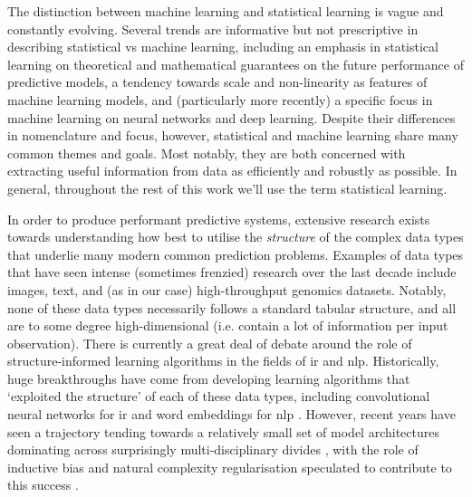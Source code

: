 \documentclass[thesis.tex]{subfiles}
\begin{document}
The distinction between machine learning and statistical learning is vague and constantly evolving. 
Several trends are informative but not prescriptive in describing statistical vs machine learning, including an emphasis in statistical learning on theoretical and mathematical guarantees on the future performance of predictive models, a tendency towards scale and non-linearity as features of machine learning models, and (particularly more recently) a specific focus in machine learning on neural networks and deep learning. Despite their differences in nomenclature and focus, however, statistical and machine learning share many common themes and goals. Most notably, they are both concerned with extracting useful information from data as efficiently and robustly as possible. In general, throughout the rest of this work we'll use the term statistical learning.

In order to produce performant predictive systems, extensive research exists towards understanding how best to utilise the \emph{structure} of the complex data types that underlie many modern common prediction problems. Examples of data types that have seen intense (sometimes frenzied) research over the last decade include images, text, and (as in our case) high-throughput genomics datasets. Notably, none of these data types necessarily follows a standard tabular structure, and all are to some degree high-dimensional (i.e. contain a lot of information per input observation). There is currently a great deal of debate around the role of structure-informed learning algorithms in the fields of \gls{ir} and \gls{nlp}. Historically, huge breakthroughs have come from developing learning algorithms that `exploited the structure' of each of these data types, including convolutional neural networks for \gls{ir} \citep{krizhevsky_imagenet_2012, he_deep_2016, huang_densely_2018} and word embeddings for \gls{nlp} \citep{mikolov_efficient_2013, bojanowski_enriching_2017, almeida_word_2019}. However, recent years have seen a trajectory tending towards a relatively small set of model architectures dominating across surprisingly multi-disciplinary divides \citep{vaswani_attention_2017, dosovitskiy_image_2021}, with the role of inductive bias and natural complexity regularisation speculated to contribute to this success \citep{de_palma_random_2019, valle-perez_deep_2019, goldblum_no_2023}.
\end{document}
